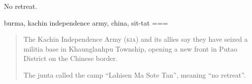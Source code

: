 No retreat.

burma, kachin independence army, china, sit-tat
===
\begin{quote}
    The Kachin Independence Army (\textsc{kia}) and its allies say they have seized a militia base in Khaunglanhpu Township, opening a new front in Putao District on the Chinese border.

    The junta called the camp “Lahisen Ma Sote Tan”, meaning “no retreat”.
\end{quote}
\nocite{2024f}